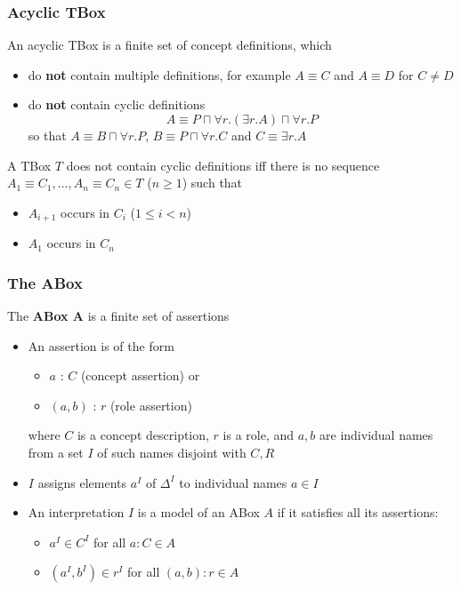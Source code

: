 \documentclass[conference, a4paper]{styles/acmsiggraph}
\begin{document}
        \subsubsection{Acyclic TBox}
            An acyclic TBox is a finite set of concept definitions, which
            \begin{itemize}
                \item do \textbf{not} contain multiple definitions, for example $A \equiv C$ and $A \equiv D$ for $C \neq D$
                \item do \textbf{not} contain cyclic definitions
                    $$A \equiv P \sqcap \forall r.(\exists r.A) \sqcap \forall r.P$$
                    so that $A \equiv B \sqcap \forall r.P$, $B \equiv P \sqcap \forall r.C$ and $C \equiv \exists r.A$
            \end{itemize}
            A TBox $T$ does not contain cyclic definitions iff there is no sequence $A_1 \equiv C_1,...,A_n \equiv C_n \in T$ ($n \geq 1$) such that 
                \begin{itemize}
                    \item $A_{i+1}$ occurs in $C_i$ ($1 \leq i < n$)
                    \item $A_1$ occurs in $C_n$
                \end{itemize}
    
\newpage
    
        \subsubsection{The ABox}
            The \textbf{ABox A} is a finite set of assertions
            \begin{itemize}
                \item An assertion is of the form
                    \begin{itemize}
                        \item $a$ : $C$ (concept assertion) or
                        \item $(a,b)$ : $r$ (role assertion)
                    \end{itemize}
                    where $C$ is a concept description, $r$ is a role, and $a,b$ are individual names from a set $I$ of such names disjoint with $C,R$
                \item $I$ assigns elements $a^I$ of $\Delta^I$ to individual names $a \in I$
                \item An interpretation $I$ is a model of an ABox $A$ if it satisfies all its assertions:
                    \begin{itemize}
                        \item $a^I \in C^I$ for all $a : C \in A$
                        \item $(a^I,b^I) \in r^I$ for all $(a,b) : r \in A$
                    \end{itemize}
            \end{itemize}
        
\end{document}
